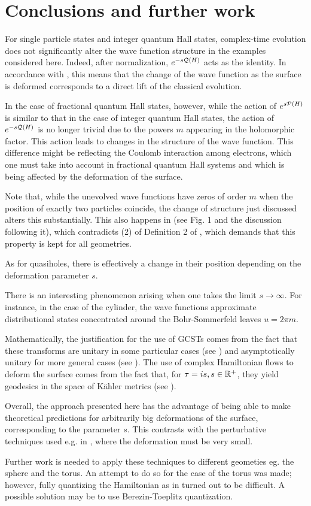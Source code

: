 \documentclass[notas.tex]{subfiles} 				%
\begin{document}
\section{Conclusions and further work}\label{sec_conclusion}
For single particle states and integer quantum Hall states, complex-time evolution does not significantly alter the wave function structure in the examples considered here. Indeed, after normalization, $e^{-s\mathcal{Q}(H)}$ acts as the identity. In accordance with , this means that the change of the wave function as the surface is deformed corresponds to a direct lift of the classical evolution. 

In the case of fractional quantum Hall states, however, while the action of $e^{s\mathcal{P}(H)}$ is similar to that in the case of integer quantum Hall states, the action of $e^{-s\mathcal{Q}(H)}$ is no longer trivial due to the powers $m$ appearing in the holomorphic factor. This action leads to changes in the structure of the wave function. This difference might be reflecting the Coulomb interaction among electrons, which one must take into account in fractional quantum Hall systems and which is being affected by the deformation of the surface.

Note that, while the unevolved wave functions have zeros of order $m$ when the position of exactly two particles coincide, the change of structure just discussed alters this substantially. This also happens in \cite{qiu_model_2012} (see Fig. 1 and the discussion following it), which contradicts (2) of Definition 2 of \cite{klevtsov_laughlin_2019}, which demands that this property is kept for all geometries. 

As for quasiholes, there is effectively a change in their position depending on the deformation parameter $s$. 

There is an interesting phenomenon arising when one takes the limit $s \to \infty$. For instance, in the case of the cylinder, the wave functions approximate distributional states concentrated around the Bohr-Sommerfeld leaves $u = 2 \pi m$. 

Mathematically, the justification for the use of GCSTs comes from the fact that these transforms are unitary in some particular cases (see \cite{kirwin_complex_2013}) and asymptotically unitary for more general cases (see ). The use of complex Hamiltonian flows to deform the surface comes from the fact that, for $\tau = is, s \in \mathbb{R}^+$, they yield geodesics in the space of Kähler metrics (see ).

Overall, the approach presented here has the advantage of being able to make theoretical predictions for arbitrarily big deformations of the surface, corresponding to the parameter $s$. This contrasts with the perturbative techniques used e.g. in \cite{johri_probing_2016}, where the deformation must be very small. 

Further work is needed to apply these techniques to different geometies eg. the sphere and the torus. An attempt to do so for the case of the torus was made; however, fully quantizing the Hamiltonian as in  turned out to be difficult. A possible solution may be to use Berezin-Toeplitz quantization.
\end{document}
